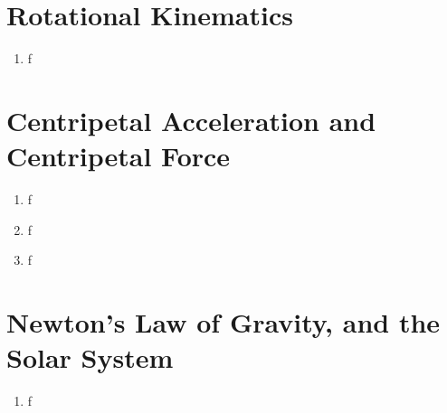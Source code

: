 \documentclass[10pt]{article}
\begin{document}
\maketitle

\section{Rotational Kinematics}
\begin{enumerate}
\item f
\end{enumerate}
\section{Centripetal Acceleration and Centripetal Force}
\begin{enumerate}
\item f
\item f
\item f
\end{enumerate}
\section{Newton's Law of Gravity, and the Solar System}
\begin{enumerate}
\item f
\end{enumerate}
\end{document}
